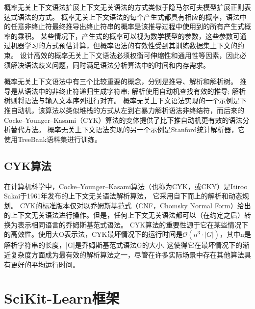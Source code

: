 概率无关上下文语法扩展上下文无关语法的方式类似于隐马尔可夫模型扩展正则表达式语法的方式。
概率无关上下文语法的每个产生式都具有相应的概率，语法中的任意非终止符最终推导出终止符串的概率是该推导过程中使用到的所有产生式概率的乘积。
某些情况下，产生式的概率可以视为数学模型的参数，这些参数可通过机器学习的方式预估计算，但概率语法的有效性受到其训练数据集上下文的约束。
设计高效的概率无关上下文语法必须权衡可伸缩性和通用性等因素，因此必须解决语法歧义问题，同时满足语法分析算法中的时间和内存需求。

概率无关上下文语法中有三个比较重要的概念，分别是推导、解析和解析树。
推导是从语法中的非终止符递归生成字符串; 解析使用自动机查找有效的推导; 解析树则将语法与输入文本序列进行对齐。
概率无关上下文语法实现的一个示例是下推自动机\cite{sippl1999biological}，该算法以类似堆栈的方式从左到右暴力解析语法非终结符，而后来的Cocke–Younger–Kasami（CYK）算法的变体提供了比下推自动机更有效的语法分析替代方法。
概率无关上下文语法实现的另一个示例是Stanford统计解析器\cite{klein2003accurate}，它使用TreeBank语料集进行训练。

\subsection{CYK算法}

在计算机科学中，Cocke–Younger–Kasami算法（也称为CYK，或CKY）是Itiroo Sakai\cite{mey1965international}于1961年发布的上下文无关语法解析算法，
它采用自下而上的解析和动态规划。
CYK的标准版本仅对以乔姆斯基范式（CNF，Chomsky Normal Form）给出的上下文无关语法进行操作。但是，任何上下文无关语法都可以（在约定之后）转换为表示相同语言的乔姆斯基范式语法。
CYK算法的重要性源于它在某些情况下的高效性。使用大O表示法，CYK最坏情况下的运行时间是$\displaystyle \mathcal{O} (n^{3} \cdot |G|)$，其中n是解析字符串的长度，|G|是乔姆斯基范式语法G的大小.
这使得它在最坏情况下的渐近复杂度方面成为最有效的解析算法之一，尽管在许多实际场景中存在其他算法具有更好的平均运行时间\cite{sipser1997context}。

\section{SciKit-Learn框架}

